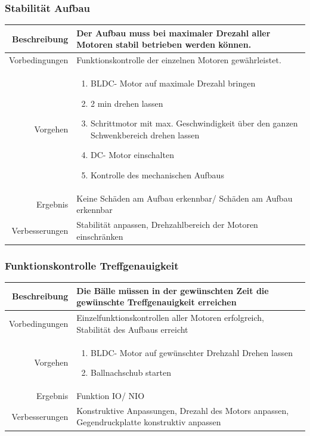 \subsubsection{Stabilität Aufbau}
\begin{table}[h!]
	\renewcommand{\arraystretch}{1.5}
	\begin{tabular}{|r|p{14cm}|}
		\hline Beschreibung & Der Aufbau muss bei maximaler Drezahl aller Motoren stabil betrieben werden können. \\ 
		\hline Vorbedingungen & Funktionskontrolle der einzelnen Motoren gewährleistet. \\ 
		\hline Vorgehen & 
		\begin{enumerate}
			\item BLDC- Motor auf maximale Drezahl bringen
			\item 2 min drehen lassen 
			\item Schrittmotor mit max. Geschwindigkeit über den ganzen Schwenkbereich drehen lassen  
			\item DC- Motor einschalten
			\item Kontrolle des mechanischen Aufbaus
		\end{enumerate} \\ 
		\hline Ergebnis & Keine Schäden am Aufbau erkennbar/ Schäden am Aufbau erkennbar \\ 
		\hline Verbesserungen & Stabilität anpassen, Drehzahlbereich der Motoren einschränken \\ 
		\hline 
	\end{tabular}
\end{table}

\subsubsection{Funktionskontrolle Treffgenauigkeit }
\begin{table}[h!]
	\renewcommand{\arraystretch}{1.5}
	\begin{tabular}{|r|p{14cm}|}
		\hline Beschreibung & Die Bälle müssen in der gewünschten Zeit die gewünschte Treffgenauigkeit erreichen   \\ 
		\hline Vorbedingungen & Einzelfunktionskontrollen aller Motoren erfolgreich, Stabilität des Aufbaus erreicht \\ 
		\hline Vorgehen & 
		\begin{enumerate}
			\item BLDC- Motor auf gewünschter Drehzahl Drehen lassen 
			\item Ballnachschub starten 
		\end{enumerate} \\ 
		\hline Ergebnis & Funktion IO/ NIO \\ 
		\hline Verbesserungen & Konstruktive Anpassungen, Drezahl des Motors anpassen, Gegendruckplatte konstruktiv anpassen \\ 
		\hline 
	\end{tabular}
\end{table}

